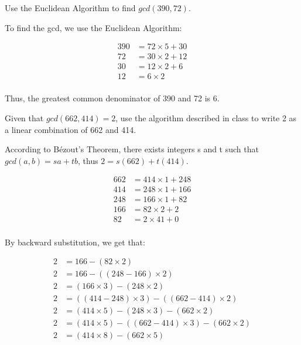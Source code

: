 \documentclass[12pt]{article}
\newenvironment{exercise}[2][Exercise]{\begin{trivlist}
\item[\hskip \labelsep {\bfseries #1}\hskip \labelsep {\bfseries #2.}]}{\end{trivlist}}
\begin{document}
\pagebreak

\begin{exercise}{2a}
Use the Euclidean Algorithm to find $gcd(390, 72)$. 
\end{exercise}

To find the gcd, we use the Euclidean Algorithm:

\begin{align*}
390 &= 72 \times 5 + 30 \\
72 &= 30 \times 2 + 12 \\
30 &= 12 \times 2 + 6 \\
12 &= 6 \times 2 \\
\end{align*}

Thus, the greatest common denominator of 390 and 72 is 6.


\begin{exercise}{2b}
Given that $gcd(662, 414) = 2$, use the algorithm described in class to write 2 as a linear combination of 662 and 414.
\end{exercise}

According to B\'ezout's Theorem, there exists integers s and t such that $gcd(a,b) = sa + tb$, thus $2 = s(662) + t(414)$.

\begin{align*}
662 &= 414 \times 1 + 248 \\
414 &= 248 \times 1 + 166 \\
248 &= 166 \times 1 + 82 \\
166 &= 82 \times 2 + 2 \\
82 &= 2 \times 41 + 0 \\
\end{align*}

By backward substitution, we get that:

\begin{align*}
2 &= 166 - (82 \times 2) \\
2 &= 166 - ((248 - 166) \times 2) \\
2 &= (166 \times 3) - (248 \times 2) \\
2 &= ((414 - 248) \times 3) - ((662 - 414) \times 2) \\
2 &= (414 \times 5) - (248 \times 3) - (662 \times 2) \\
2 &= (414 \times 5) - ((662 - 414) \times 3) - (662 \times 2) \\
2 &= (414 \times 8) - (662 \times 5) \\
\end{align*}
\end{document}
